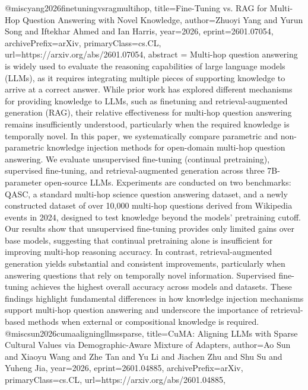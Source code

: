 {}@misc{yang2026finetuningvsragmultihop,
      title={Fine-Tuning vs. RAG for Multi-Hop Question Answering with Novel Knowledge}, 
      author={Zhuoyi Yang and Yurun Song and Iftekhar Ahmed and Ian Harris},
      year={2026},
      eprint={2601.07054},
      archivePrefix={arXiv},
      primaryClass={cs.CL},
      url={https://arxiv.org/abs/2601.07054},
      abstract = {Multi-hop question answering is widely used to evaluate the reasoning capabilities of large language models (LLMs), as it requires integrating multiple pieces of supporting knowledge to arrive at a correct answer. While prior work has explored different mechanisms for providing knowledge to LLMs, such as finetuning and retrieval-augmented generation (RAG), their relative effectiveness for multi-hop question answering remains insufficiently understood, particularly when the required knowledge is temporally novel.   In this paper, we systematically compare parametric and non-parametric knowledge injection methods for open-domain multi-hop question answering. We evaluate unsupervised fine-tuning (continual pretraining), supervised fine-tuning, and retrieval-augmented generation across three 7B-parameter open-source LLMs. Experiments are conducted on two benchmarks: QASC, a standard multi-hop science question answering dataset, and a newly constructed dataset of over 10,000 multi-hop questions derived from Wikipedia events in 2024, designed to test knowledge beyond the models' pretraining cutoff.   Our results show that unsupervised fine-tuning provides only limited gains over base models, suggesting that continual pretraining alone is insufficient for improving multi-hop reasoning accuracy. In contrast, retrieval-augmented generation yields substantial and consistent improvements, particularly when answering questions that rely on temporally novel information. Supervised fine-tuning achieves the highest overall accuracy across models and datasets. These findings highlight fundamental differences in how knowledge injection mechanisms support multi-hop question answering and underscore the importance of retrieval-based methods when external or compositional knowledge is required.}
}@misc{sun2026cumaaligningllmssparse,
      title={CuMA: Aligning LLMs with Sparse Cultural Values via Demographic-Aware Mixture of Adapters}, 
      author={Ao Sun and Xiaoyu Wang and Zhe Tan and Yu Li and Jiachen Zhu and Shu Su and Yuheng Jia},
      year={2026},
      eprint={2601.04885},
      archivePrefix={arXiv},
      primaryClass={cs.CL},
      url={https://arxiv.org/abs/2601.04885},
}
